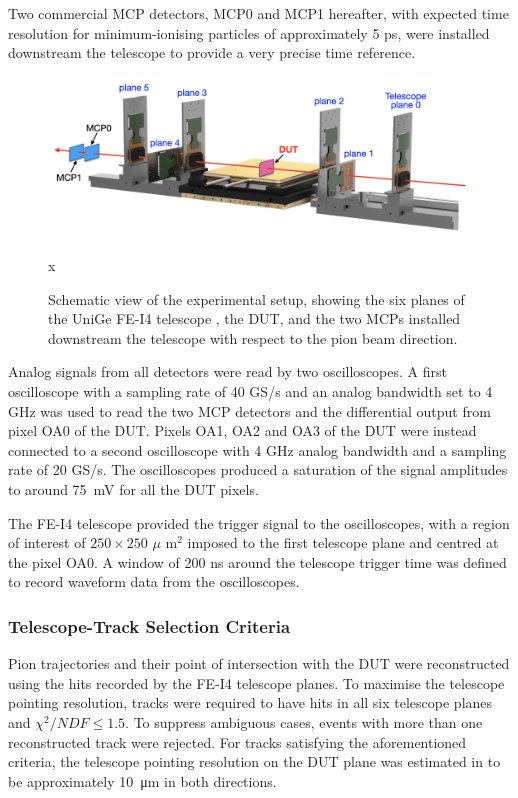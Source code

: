 		 Two commercial MCP detectors, MCP0 and MCP1 hereafter, with expected time resolution for minimum-ionising particles of approximately 5 ps, were installed downstream the telescope to provide a very precise time reference.

		\begin{figure}[h]
			\centering
			\includegraphics[width=0.9\linewidth]{files/MONOLITH_paper/telescope.png}
			\caption{Schematic view of the experimental setup, showing the six planes of the UniGe FE-I4 telescope \cite{telescope}, the DUT, and the two MCPs installed downstream the telescope with respect to the pion beam direction.}
			\label{im:MONO_Setup} x
		\end{figure}

		Analog signals from all detectors were read by two oscilloscopes. A first oscilloscope with a sampling rate of 40 GS/s and an analog bandwidth set to 4 GHz was used to read the two MCP detectors and the differential output from pixel OA0 of the DUT. Pixels OA1, OA2 and OA3 of the DUT were instead connected to a second oscilloscope with 4 GHz analog bandwidth and a sampling rate of 20 GS/s. The oscilloscopes produced a saturation of the signal amplitudes to around \SI{75}{\milli\volt} for all the DUT pixels. 

		The FE-I4 telescope provided the trigger signal to the oscilloscopes, with a region of interest of $250 \times 250 $ $\mu$ m$^2$ imposed to the first telescope plane and centred at the pixel OA0. A window of 200 ns around the telescope trigger time was defined to record waveform data from the oscilloscopes.  


		\subsubsection{Telescope-Track Selection Criteria}
		Pion trajectories and their point of intersection with the DUT were reconstructed using the hits recorded by the FE-I4 telescope planes. To maximise the telescope pointing resolution, tracks were required to have hits in all six telescope planes and $ \chi^{2}/NDF \le 1.5 $. To suppress ambiguous cases, events with more than one reconstructed track were rejected. For tracks satisfying the aforementioned criteria, the telescope pointing resolution on the DUT plane was estimated in \cite{vicente_thesis} to be approximately \SI{10}{\um} in both directions.
		
